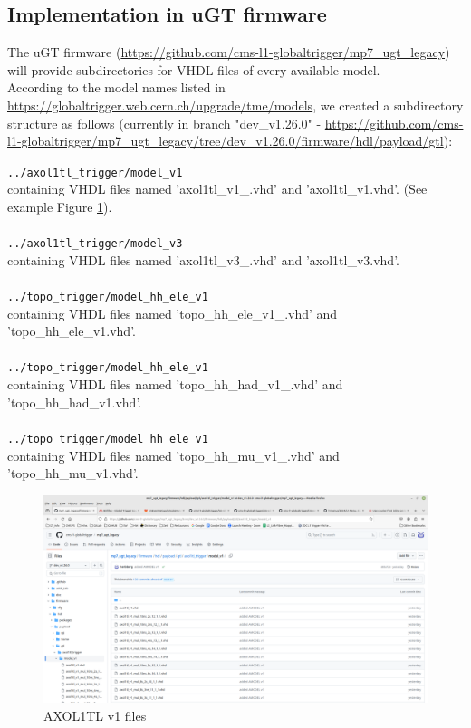 \subsection{Implementation in uGT firmware}

The uGT firmware (\url{https://github.com/cms-l1-globaltrigger/mp7_ugt_legacy}) will provide subdirectories for VHDL files of every available model.\\
According to the model names listed in \url{https://globaltrigger.web.cern.ch/upgrade/tme/models}, we created a subdirectory structure as follows (currently in branch "dev\_v1.26.0" - \url{https://github.com/cms-l1-globaltrigger/mp7_ugt_legacy/tree/dev_v1.26.0/firmware/hdl/payload/gtl}):

\texttt{../axol1tl\_trigger/model\_v1}\\
containing VHDL files named 'axol1tl\_v1\_<hls file name>.vhd' and 'axol1tl\_v1.vhd'. (See example Figure \ref{fig:axol1tl_v1_files}).\\\\
\texttt{../axol1tl\_trigger/model\_v3}\\
containing VHDL files named 'axol1tl\_v3\_<hls file name>.vhd' and 'axol1tl\_v3.vhd'.\\\\
\texttt{../topo\_trigger/model\_hh\_ele\_v1}\\
containing VHDL files named 'topo\_hh\_ele\_v1\_<hls file name>.vhd' and 'topo\_hh\_ele\_v1.vhd'.\\\\
\texttt{../topo\_trigger/model\_hh\_ele\_v1}\\
containing VHDL files named 'topo\_hh\_had\_v1\_<hls file name>.vhd' and 'topo\_hh\_had\_v1.vhd'.\\\\
\texttt{../topo\_trigger/model\_hh\_ele\_v1}\\
containing VHDL files named 'topo\_hh\_mu\_v1\_<hls file name>.vhd' and 'topo\_hh\_mu\_v1.vhd'.\\

\begin{figure}[htb]
\centering
\includegraphics[width=15cm]{figures/axol1tl_v1_files}
\caption{AXOL1TL v1 files}
\label{fig:axol1tl_v1_files}
\end{figure}



